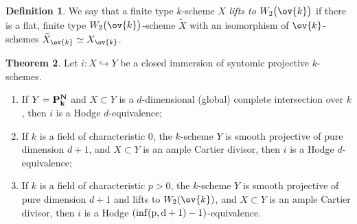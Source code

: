 \documentclass[11pt,reqno]{amsart}
\numberwithin{equation}{section}
\theoremstyle{definition}
\newtheorem{thm}{Theorem}[subsection]
\newtheorem{defn}[thm]{Definition}
\begin{document}
\begin{defn} We say that a finite type $k$-scheme $X$ {\it lifts to $W_2\big(\ov{k}\big)$} if there is a flat, finite type $W_2\big(\ov{k}\big)$-scheme $\widetilde{X}$ with an isomorphism of $\ov{k}$-schemes $\widetilde{X}_{\ov{k}} \simeq X_{\ov{k}}$.
\end{defn}

\begin{thm}\label{thm:derived-lefschetz} Let $i\colon X \hookrightarrow Y$ be a closed immersion of syntomic projective $k$-schemes.
\begin{enumerate}
    \item\label{thm:derived-lefschetz-1} If $Y = \bf{P}^N_k$ and $X \subset Y$ is a $d$-dimensional (global) complete intersection over $k$, then $i$ is a Hodge $d$-equivalence;
    \item If $k$ is a field of characteristic $0$, the $k$-scheme $Y$ is smooth projective of pure dimension $d+1$, and $X\subset Y$ is an ample Cartier divisor, then $i$ is a Hodge $d$-equivalence;
    \item If $k$ is a field of characteristic $p>0$, the $k$-scheme $Y$ is smooth projective of pure dimension $d+1$ and lifts to $W_2(\ov{k})$, and $X\subset Y$ is an ample Cartier divisor, then $i$ is a Hodge $\left(\rm{inf}(p, d+1)-1\right)$-equivalence.
\end{enumerate}
\end{thm}
\end{document}

